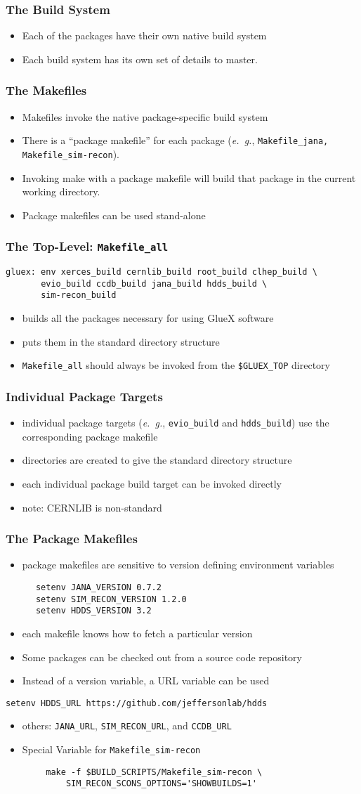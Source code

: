 \documentclass{beamer}
\newcommand{\bi}{\begin{itemize}}
\newcommand{\ei}{\end{itemize}}
\newcommand{\I}{\item}
\begin{document}
\begin{frame}\frametitle{The Build System}
\bi
\I Each of the packages have their own native build system
\I Each build system has its own set of details to master.
\ei
\end{frame}\begin{frame}\frametitle{The Makefiles}
\bi
\I Makefiles invoke the native package-specific build system
\I There is a ``package makefile'' for each package ({\it e.~g.}, {\tt Makefile\_jana, Makefile\_sim-recon}).
\I Invoking make with a package makefile will build that package in the current working directory.
\I Package makefiles can be used stand-alone
\ei
\end{frame}
\begin{frame}[fragile]
  \frametitle{The Top-Level: {\tt Makefile\_all}}

\begin{verbatim}
gluex: env xerces_build cernlib_build root_build clhep_build \
       evio_build ccdb_build jana_build hdds_build \
       sim-recon_build
\end{verbatim}
\bi
\I builds all the packages necessary for using GlueX software
\I puts them in the standard directory structure
\I {{\tt Makefile\_all}} should always be invoked from the {\tt \$GLUEX\_TOP} directory
\ei
\end{frame}
\begin{frame}\frametitle{Individual Package Targets}
\bi
\I individual package targets ({\it e.~g.}, {\tt evio\_build}
and {\tt hdds\_build}) use the corresponding package makefile
\I directories are created to give the standard directory structure
\I each individual package build target can be invoked directly
\I note: CERNLIB is non-standard
\ei
\end{frame}
\begin{frame}[fragile]
  \frametitle{The Package Makefiles}
\bi
\I package makefiles are sensitive to version defining environment variables
\ei
\begin{verbatim}
      setenv JANA_VERSION 0.7.2
      setenv SIM_RECON_VERSION 1.2.0
      setenv HDDS_VERSION 3.2
\end{verbatim}
\bi
\I each makefile knows how to fetch a particular version
\I Some packages can be checked out from a source code repository
\I Instead of a version variable, a URL variable can be used
\ei
\begin{verbatim}
setenv HDDS_URL https://github.com/jeffersonlab/hdds
\end{verbatim}
\bi
\I others: {\tt JANA\_URL}, {\tt SIM\_RECON\_URL}, and {\tt CCDB\_URL}
\I Special Variable for {\tt Makefile\_sim-recon}
\ei
\begin{verbatim}
        make -f $BUILD_SCRIPTS/Makefile_sim-recon \
            SIM_RECON_SCONS_OPTIONS='SHOWBUILDS=1'
\end{verbatim}
\end{frame}
\end{document}
